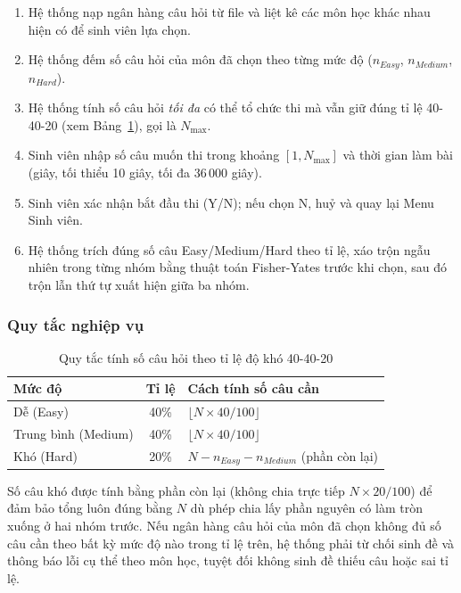 \documentclass[11pt]{report}
\begin{document}
\begin{enumerate}[leftmargin=*, label=\arabic*.]
    \item Hệ thống nạp ngân hàng câu hỏi từ file và liệt kê các môn học khác nhau hiện có để sinh viên lựa chọn.
    \item Hệ thống đếm số câu hỏi của môn đã chọn theo từng mức độ ($n_{Easy}$, $n_{Medium}$, $n_{Hard}$).
    \item Hệ thống tính số câu hỏi \textit{tối đa} có thể tổ chức thi mà vẫn giữ đúng tỉ lệ 40-40-20 (xem Bảng~\ref{tab:ratio}), gọi là $N_{\max}$.
    \item Sinh viên nhập số câu muốn thi trong khoảng $[1, N_{\max}]$ và thời gian làm bài (giây, tối thiểu 10 giây, tối đa 36\,000 giây).
    \item Sinh viên xác nhận bắt đầu thi (Y/N); nếu chọn N, huỷ và quay lại Menu Sinh viên.
    \item Hệ thống trích đúng số câu Easy/Medium/Hard theo tỉ lệ, xáo trộn ngẫu nhiên trong từng nhóm bằng thuật toán Fisher-Yates trước khi chọn, sau đó trộn lẫn thứ tự xuất hiện giữa ba nhóm.
\end{enumerate}

\subsubsection{Quy tắc nghiệp vụ}

\begin{table}[H]
    \centering
    \begin{tabularx}{\textwidth}{|l|c|X|} \hline
        \textbf{Mức độ} & \textbf{Tỉ lệ} & \textbf{Cách tính số câu cần} \\ \hline
        Dễ (Easy) & 40\% & $\lfloor N \times 40 / 100 \rfloor$ \\ \hline
        Trung bình (Medium) & 40\% & $\lfloor N \times 40 / 100 \rfloor$ \\ \hline
        Khó (Hard) & 20\% & $N - n_{Easy} - n_{Medium}$ (phần còn lại) \\ \hline
    \end{tabularx}
    \caption{Quy tắc tính số câu hỏi theo tỉ lệ độ khó 40-40-20}
    \label{tab:ratio}
\end{table}

Số câu khó được tính bằng phần còn lại (không chia trực tiếp $N \times 20/100$) để đảm bảo tổng luôn đúng bằng $N$ dù phép chia lấy phần nguyên có làm tròn xuống ở hai nhóm trước. Nếu ngân hàng câu hỏi của môn đã chọn không đủ số câu cần theo bất kỳ mức độ nào trong tỉ lệ trên, hệ thống phải từ chối sinh đề và thông báo lỗi cụ thể theo môn học, tuyệt đối không sinh đề thiếu câu hoặc sai tỉ lệ.
\end{document}
